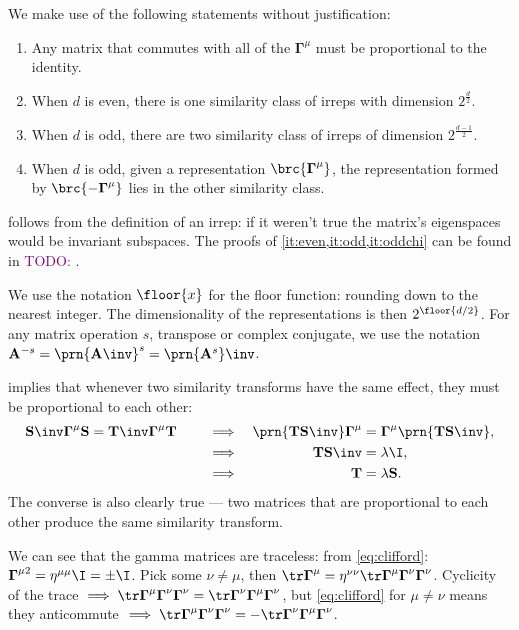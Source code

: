 \documentclass[11pt]{article}
\newcommand{\todo}[1]{\textcolor{purple}{TODO: #1}}
\newcommand{\Gammab}{\boldsymbol{\Gamma}}
\renewcommand{\S}{\mathbf{S}}
\newcommand{\T}{\mathbf{T}}
\newcommand{\A}{\mathbf{A}}
\begin{document}
We make use of the following statements without justification:
%
\begin{enumerate}
  \item Any matrix that commutes with all of the \(\Gammab^\mu\) must be proportional to the identity.
      \label{it:commute}
  \item When \(d\) is even, there is one similarity class of irreps with dimension \(2^{\frac{d}{2}}\).
      \label{it:even}
  \item When \(d\) is odd, there are two similarity class of irreps of dimension \(2^{\frac{d-1}{2}}\).
      \label{it:odd}
  \item When \(d\) is odd, given a representation \(\brc{\Gammab^\mu}\), the representation formed by \(\brc{ -\Gammab^\mu }\) lies in the other similarity class.
      \label{it:oddchi}
\end{enumerate}
%
 follows from the definition of an irrep: if it weren't true the matrix's eigenspaces would be invariant subspaces.
The proofs of \cref{it:even,it:odd,it:oddchi} can be found in \todo{}.

We use the notation \(\floor{x}\) for the floor function: rounding down to the nearest integer.
The dimensionality of the representations is then \(2^{\floor{d/2}}\).
For any matrix operation \(s\), \eg transpose or complex conjugate, we use the notation \( \A^{-s} = \prn{\A\inv}^s = \prn{\A^s}\inv \).

 implies that whenever two similarity transforms have the same effect, they must be proportional to each other:
%
\begin{equation}\label{eq:simsim}
  \S\inv \Gammab^\mu \S = \T\inv \Gammab^\mu \T
  \qquad
  \begin{aligned}[t]
     &\implies &
     \prn{\T \S\inv} \Gammab^\mu &= \Gammab^\mu \prn{\T \S\inv}, \\
     &\implies &
     \T \S\inv &= \lambda \I, \\
     &\implies &
     \T &= \lambda \S.
  \end{aligned}
\end{equation}
%
The converse is also clearly true --- two matrices that are proportional to each other produce the same similarity transform.

We can see that the gamma matrices are traceless: from \cref{eq:clifford}: \( \Gammab^{\mu2} = \eta^{\mu\mu} \I = \pm \I \).
Pick some \(\nu \neq \mu\), then \( \tr \Gammab^\mu = \eta^{\nu\nu} \tr \Gammab^\mu \Gammab^\nu \Gammab^\nu \).
Cyclicity of the trace \( \implies \tr \Gammab^\mu \Gammab^\nu \Gammab^\nu = \tr \Gammab^\nu \Gammab^\mu \Gammab^\nu \), but \cref{eq:clifford} for \(\mu \neq \nu\) means they anticommute \( \implies \tr \Gammab^\mu \Gammab^\nu \Gammab^\nu = - \tr \Gammab^\nu \Gammab^\mu \Gammab^\nu \).
\end{document}
